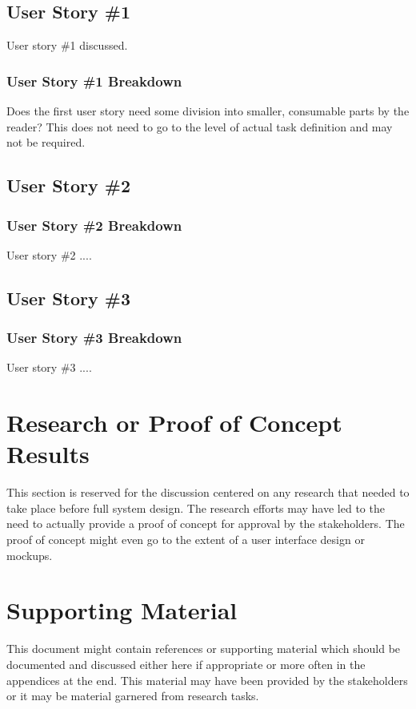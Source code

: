 \subsection{User Story \#1}
User story \#1 discussed. 

\subsubsection{User Story \#1 Breakdown}
Does the first user story need some division into smaller, consumable parts by 
the reader?  This does not need to go to the level of actual task definition and 
may not be required. 

\subsection{User Story \#2} 

\subsubsection{User Story \#2 Breakdown}
User story \#2  .... 

\subsection{User Story \#3} 

\subsubsection{User Story \#3 Breakdown}
User story \#3  .... 


\section{Research or Proof of Concept Results}
This section is reserved for the discussion centered on any research that needed 
to take place before full system design.  The research efforts may have led to 
the need to actually provide a proof of concept for approval by the stakeholders. 
 The proof of concept might even go to the extent of a user interface design or 
mockups. 


\section{Supporting Material}


This document might contain references or supporting material which should be documented 
and discussed  either here if appropriate or more often in the appendices at the end.  This material may have been provided by the stakeholders  
or it may be material garnered from research tasks.

